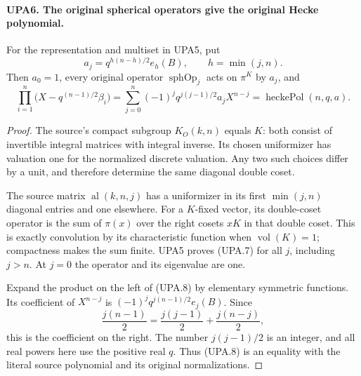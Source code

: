 \documentclass[11pt,a4paper]{article}
\numberwithin{equation}{section}
\theoremstyle{remark}\newtheorem{remark}[theorem]{Remark}
\begin{document}
\paragraph{UPA6. The original spherical operators give the original Hecke polynomial.}
\label{claim:UPA6}
For the representation and multiset in UPA5, put
\[
 a_j=q^{h(n-h)/2}e_h(B),\qquad h=\min(j,n).
 \tag{UPA.7}
\]
Then $a_0=1$, every original operator $\operatorname{sphOp}_j$
acts on $\pi^K$ by $a_j$, and
\[
 \prod_{i=1}^n\bigl(X-q^{(n-1)/2}\beta_i\bigr)
 =\sum_{j=0}^n(-1)^j q^{j(j-1)/2}a_jX^{n-j}
 =\operatorname{heckePol}(n,q,a).
 \tag{UPA.8}
\]
\begin{proof}
The source's compact subgroup $K_O(k,n)$ equals $K$:
both consist of invertible integral matrices with integral inverse.
Its chosen uniformizer has valuation one for the normalized
discrete valuation.  Any two such choices differ by a unit,
and therefore determine the same diagonal double coset.

The source matrix $\operatorname{al}(k,n,j)$ has a uniformizer
in its first $\min(j,n)$ diagonal entries and one elsewhere.
For a $K$-fixed vector, its double-coset operator is the
sum of $\pi(x)$ over the right cosets $xK$ in that double
coset.  This is exactly convolution by its characteristic
function when $\operatorname{vol}(K)=1$; compactness makes
the sum finite.  UPA5 proves (UPA.7) for all $j$, including
$j>n$.  At $j=0$ the operator and its eigenvalue are one.

Expand the product on the left of (UPA.8) by elementary
symmetric functions.  Its coefficient of $X^{n-j}$ is
$(-1)^j q^{j(n-1)/2}e_j(B)$.  Since
\[
       \frac{j(n-1)}2
          =\frac{j(j-1)}2+\frac{j(n-j)}2,
\]
this is the coefficient on the right.  The number
$j(j-1)/2$ is an integer, and all real powers here use the
positive real $q$.  Thus (UPA.8) is an equality with the
literal source polynomial and its original normalizations.
\end{proof}

\end{document}
